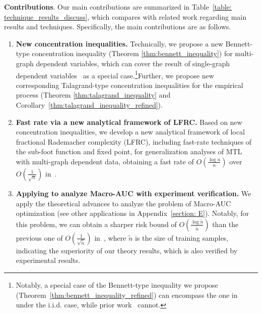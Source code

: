 \documentclass{article}
\begin{document}
\textbf{Contributions}. Our main contributions are summarized in Table~\ref{table: technique_results_discuss}, which compares with related work regarding main results and techniques. Specifically, the main contributions are as follows.
\begin{enumerate}[1.]
\setlength\itemsep{-0.2pt}
\vspace{-0.1in}
    \item \textbf{New concentration inequalities.} Technically, we propose a new Bennett-type concentration inequality (Theorem \ref{thm:bennett_inequality}) for multi-graph dependent variables, which can cover the result of single-graph dependent variables~\cite{ralaivola2015entropy} as a special case.\footnote{Notably, a special case of the Bennett-type inequality we propose (Theorem~\ref{thm:bennett_inequality_refined}) can encompass the one in~\cite{Bartlett_2005} under the i.i.d. case, while prior work~\cite{ralaivola2015entropy} cannot.}Further, we propose new corresponding Talagrand-type concentration inequalities for the empirical process (Theorem \ref{thm:talagrand_inequality} and Corollary~\ref{thm:talagrand_inequality_refined}). 
    \item \textbf{Fast rate via a new analytical framework of LFRC.} Based on new concentration inequalities, we develop a new analytical framework of local fractional Rademacher complexity (LFRC), including fast-rate techniques of the sub-foot function and fixed point, for generalization analyses of MTL with multi-graph dependent data, obtaining a fast rate of $O(\frac{\log n}{n})$ over $O(\frac{1}{\sqrt{n}})$ in~\cite{wu2023macro-auc}.
    \item \textbf{Applying to analyze Macro-AUC with experiment verification.} We apply the theoretical advances to analyze the problem of Macro-AUC optimization (see other applications in Appendix~\ref{section: E}). 
    Notably, for this problem, we can obtain a sharper risk bound of $O(\frac{\log \tilde{n}}{\tilde{n}})$ than the previous one of $O(\frac{1}{\sqrt{\tilde{n}}})$ in~\cite{wu2023macro-auc}, where $\tilde{n}$ is the size of training samples, indicating the superiority of our theory results, which is also verified by experimental results.
\end{enumerate}
\end{document}
